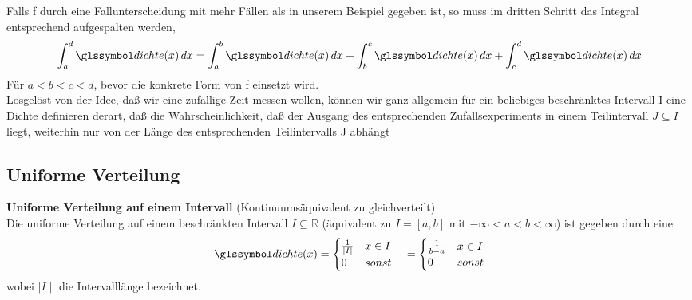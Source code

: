 \begin{bem} 
Falls f durch eine Fallunterscheidung mit mehr Fällen als in unserem Beispiel gegeben ist, so muss im
    dritten Schritt das Integral entsprechend aufgespalten werden,
    \[
        \int^d_a \dcht(x) \dx = \int^b_a \dcht(x) \dx + \int^c_b \dcht(x) \dx + \int^d_c \dcht(x) \dx
    \]
    Für $a < b < c < d$, bevor die konkrete Form von f einsetzt wird. \\
    Losgelöst von der Idee, daß wir eine zufällige Zeit messen wollen, können wir ganz allgemein für ein
    beliebiges beschränktes Intervall I eine Dichte definieren derart, daß die Wahrscheinlichkeit, daß der
    Ausgang des entsprechenden Zufallsexperiments in einem Teilintervall $J \subseteq I$ liegt, weiterhin nur von
    der Länge des entsprechenden Teilintervalls J abhängt
\end{bem}


\subsection{Uniforme Verteilung}
\begin{defi}
    \textbf{Uniforme Verteilung auf einem Intervall}
    \label{def:uniform_intervall} (Kontinuumsäquivalent zu gleichverteilt)
     \\
    Die uniforme Verteilung auf einem beschränkten Intervall $I \subseteq \mathbb{R}$ (äquivalent zu $I = [a, b]$ mit $- \infty < a < b < \infty$) ist gegeben
    durch eine \dichte
    \[
        \dcht(x) = \begin{cases}
                       \frac{1}{\mid I \mid } & x \in I \\ 0 & sonst
        \end{cases} \quad = \begin{cases}
                                                   \frac{1}{b-a} & x \in I \\ 0 & sonst
        \end{cases}
    \]
    wobei $\mid I \mid $ die Intervalllänge bezeichnet. \\
\end{defi}

